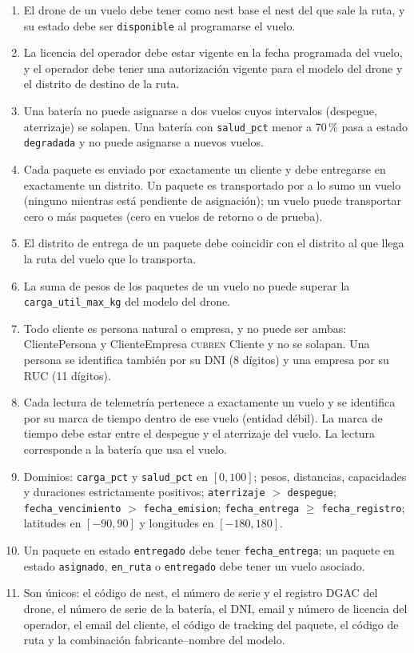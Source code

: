 \documentclass[11pt,a4paper]{article}
\newcommand{\at}[1]{\texttt{#1}}
\begin{document}
\begin{enumerate}[label=\textbf{R\arabic*.}, leftmargin=*]
\item El drone de un vuelo debe tener como nest base el nest del que sale la ruta, y su estado debe ser \at{disponible} al programarse el vuelo.
\item La licencia del operador debe estar vigente en la fecha programada del vuelo, y el operador debe tener una autorización vigente para el modelo del drone y el distrito de destino de la ruta.
\item Una batería no puede asignarse a dos vuelos cuyos intervalos (despegue, aterrizaje) se solapen. Una batería con \at{salud\_pct} menor a 70\,\% pasa a estado \at{degradada} y no puede asignarse a nuevos vuelos.
\item Cada paquete es enviado por exactamente un cliente y debe entregarse en exactamente un distrito. Un paquete es transportado por a lo sumo un vuelo (ninguno mientras está pendiente de asignación); un vuelo puede transportar cero o más paquetes (cero en vuelos de retorno o de prueba).
\item El distrito de entrega de un paquete debe coincidir con el distrito al que llega la ruta del vuelo que lo transporta.
\item La suma de pesos de los paquetes de un vuelo no puede superar la \at{carga\_util\_max\_kg} del modelo del drone.
\item Todo cliente es persona natural o empresa, y no puede ser ambas: ClientePersona y ClienteEmpresa \textsc{cubren} Cliente y no se solapan. Una persona se identifica también por su DNI (8 dígitos) y una empresa por su RUC (11 dígitos).
\item Cada lectura de telemetría pertenece a exactamente un vuelo y se identifica por su marca de tiempo dentro de ese vuelo (entidad débil). La marca de tiempo debe estar entre el despegue y el aterrizaje del vuelo. La lectura corresponde a la batería que usa el vuelo.
\item Dominios: \at{carga\_pct} y \at{salud\_pct} en $[0,100]$; pesos, distancias, capacidades y duraciones estrictamente positivos; \at{aterrizaje} $>$ \at{despegue}; \at{fecha\_vencimiento} $>$ \at{fecha\_emision}; \at{fecha\_entrega} $\geq$ \at{fecha\_registro}; latitudes en $[-90,90]$ y longitudes en $[-180,180]$.
\item Un paquete en estado \at{entregado} debe tener \at{fecha\_entrega}; un paquete en estado \at{asignado}, \at{en\_ruta} o \at{entregado} debe tener un vuelo asociado.
\item Son únicos: el código de nest, el número de serie y el registro DGAC del drone, el número de serie de la batería, el DNI, email y número de licencia del operador, el email del cliente, el código de tracking del paquete, el código de ruta y la combinación fabricante--nombre del modelo.
\end{enumerate}
\end{document}
